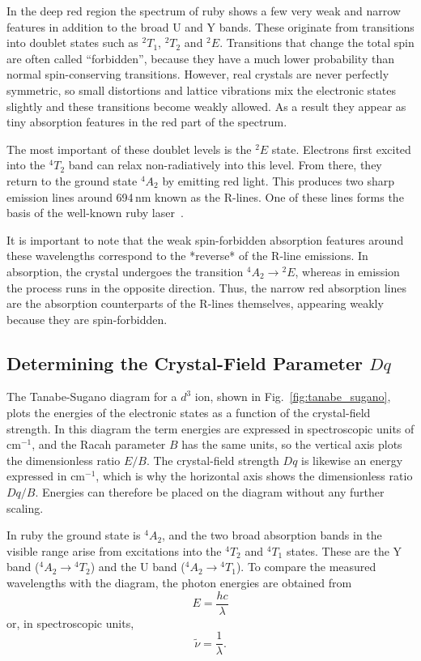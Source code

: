 \documentclass[a4paper]{article}
\begin{document}
In the deep red region the spectrum of ruby shows a few very weak and narrow features in addition to the broad U and Y bands.
These originate from transitions into doublet states such as ${}^{2}T_{1}$, ${}^{2}T_{2}$ and ${}^{2}E$.
Transitions that change the total spin are often called ``forbidden'', because they have a much lower probability than normal spin-conserving transitions.
However, real crystals are never perfectly symmetric, so small distortions and lattice vibrations mix the electronic states slightly and these transitions become weakly allowed.
As a result they appear as tiny absorption features in the red part of the spectrum.

The most important of these doublet levels is the ${}^{2}E$ state.
Electrons first excited into the ${}^{4}T_{2}$ band can relax non-radiatively into this level.
From there, they return to the ground state ${}^{4}A_{2}$ by emitting red light.
This produces two sharp emission lines around 694\,nm known as the R-lines. One of these lines forms the basis of the well-known ruby laser~\cite{kitzmann_molecular_ruby_2022,wikipedia_ruby_pressure_scale}.

It is important to note that the weak spin-forbidden absorption features around these wavelengths correspond to the *reverse* of the R-line emissions.
In absorption, the crystal undergoes the transition ${}^{4}A_{2} \rightarrow {}^{2}E$, whereas in emission the process runs in the opposite direction.
Thus, the narrow red absorption lines are the absorption counterparts of the R-lines themselves, appearing weakly because they are spin-forbidden.


\subsection{Determining the Crystal-Field Parameter \texorpdfstring{$Dq$}{}}

The Tanabe-Sugano diagram for a $d^{3}$ ion, shown in Fig.~\ref{fig:tanabe_sugano}, plots the energies of the electronic states as a function of the crystal-field strength.
In this diagram the term energies are expressed in spectroscopic units of $\mathrm{cm^{-1}}$, and the Racah parameter $B$ has the same units, so the vertical axis plots the dimensionless ratio $E/B$.
The crystal-field strength $Dq$ is likewise an energy expressed in $\mathrm{cm^{-1}}$, which is why the horizontal axis shows the dimensionless ratio $Dq/B$.
Energies can therefore be placed on the diagram without any further scaling.

In ruby the ground state is ${}^{4}A_{2}$, and the two broad absorption bands in the visible range arise from excitations into the ${}^{4}T_{2}$ and ${}^{4}T_{1}$ states.
These are the Y band (${}^{4}A_{2}\rightarrow{}^{4}T_{2}$) and the U band (${}^{4}A_{2}\rightarrow{}^{4}T_{1}$).
To compare the measured wavelengths with the diagram, the photon energies are obtained from
\begin{equation}
    E = \frac{hc}{\lambda}
    \label{eq:photon_energy}
\end{equation}
or, in spectroscopic units,
\[
\tilde{\nu} = \frac{1}{\lambda}.
\]
\end{document}
